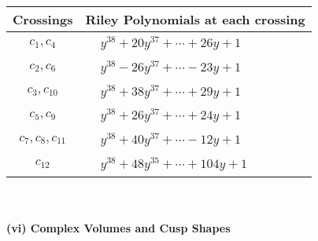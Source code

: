 \documentclass[1p]{elsarticle_modified}
\theoremstyle{definition}
\begin{document}
\begin{tabular}{m{50pt}|m{274pt}}
Crossings & \hspace{64pt}Riley Polynomials at each crossing \\
\hline $$\begin{aligned}c_{1},c_{4}\end{aligned}$$&$\begin{aligned}
&y^{38}+20 y^{37}+\cdots+26 y+1
\end{aligned}$\\
\hline $$\begin{aligned}c_{2},c_{6}\end{aligned}$$&$\begin{aligned}
&y^{38}-26 y^{37}+\cdots-23 y+1
\end{aligned}$\\
\hline $$\begin{aligned}c_{3},c_{10}\end{aligned}$$&$\begin{aligned}
&y^{38}+38 y^{37}+\cdots+29 y+1
\end{aligned}$\\
\hline $$\begin{aligned}c_{5},c_{9}\end{aligned}$$&$\begin{aligned}
&y^{38}+26 y^{37}+\cdots+24 y+1
\end{aligned}$\\
\hline $$\begin{aligned}c_{7},c_{8},c_{11}\end{aligned}$$&$\begin{aligned}
&y^{38}+40 y^{37}+\cdots-12 y+1
\end{aligned}$\\
\hline $$\begin{aligned}c_{12}\end{aligned}$$&$\begin{aligned}
&y^{38}+48 y^{35}+\cdots+104 y+1
\end{aligned}$\\
\hline
\end{tabular}\\~\\
\newpage\flushleft \textbf{(vi) Complex Volumes and Cusp Shapes}
\end{document}
